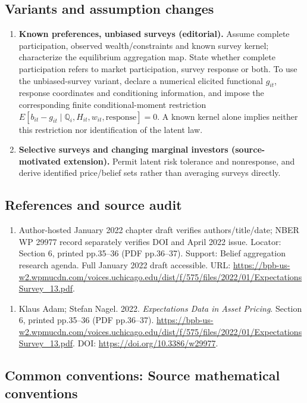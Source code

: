 \documentclass[11pt,a4paper]{article}
\begin{document}
\subsection*{Variants and assumption changes}
\begin{enumerate}
\item \textbf{Known preferences, unbiased surveys (editorial).} Assume complete participation, observed wealth/constraints and known survey kernel; characterize the equilibrium aggregation map. State whether complete participation refers to market participation, survey response or both. To use the unbiased-survey variant, declare a numerical elicited functional \(g_{it}\), response coordinates and conditioning information, and impose the corresponding finite conditional-moment restriction \(E[b_{it}-g_{it}\mid\mathbb Q_i,H_{it},w_{it},\text{response}]=0\). A known kernel alone implies neither this restriction nor identification of the latent law.
\item \textbf{Selective surveys and changing marginal investors (source-motivated extension).} Permit latent risk tolerance and nonresponse, and derive identified price/belief sets rather than averaging surveys directly.
\end{enumerate}
\subsection*{References and source audit}
\begin{enumerate}
\item Author-hosted January 2022 chapter draft verifies authors/title/date; NBER WP 29977 record separately verifies DOI and April 2022 issue. Locator: Section 6, printed pp.35--36 (PDF pp.36--37). Support: Belief aggregation research agenda. Full January 2022 draft accessible. URL: \url{https://bpb-us-w2.wpmucdn.com/voices.uchicago.edu/dist/f/575/files/2022/01/ExpectationsSurvey_13.pdf}.
\end{enumerate}
\begin{enumerate}\raggedright
\item\hypertarget{definitions:source:30007595:1}{} Klaus Adam; Stefan Nagel. 2022. \emph{Expectations Data in Asset Pricing}. Section 6, printed pp.35--36 (PDF pp.36--37).
\url{https://bpb-us-w2.wpmucdn.com/voices.uchicago.edu/dist/f/575/files/2022/01/ExpectationsSurvey_13.pdf}.
DOI: \url{https://doi.org/10.3386/w29977}.
\end{enumerate}

\subsection*{Common conventions: Source mathematical conventions}
\end{document}
